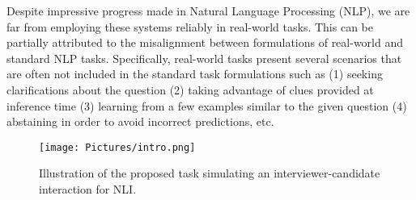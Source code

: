 \documentclass[11pt,a4paper]{article}
\providecommand{\Swaroop}[1]{
    {\protect\color{red}{[Swaroop: #1]}}
}
\newcommand{\Neeraj}[1]{{\small \color{red} [Neeraj: #1]}}
\begin{document}
Despite impressive progress made in Natural Language Processing (NLP), we are far from employing these systems reliably in real-world tasks. 
This can be partially attributed to the misalignment between formulations of real-world and standard NLP tasks.
Specifically, real-world tasks present several scenarios that are often not included in the standard task formulations such as 
(1) seeking clarifications about the question
(2) taking advantage of clues provided at inference time
(3) learning from a few examples similar to the given question
(4) abstaining in order to avoid incorrect predictions, etc.

\begin{figure}[t]
    \centering
    \texttt{[image: Pictures/intro.png]}
    \caption{Illustration of the proposed task simulating an interviewer-candidate interaction for NLI.
    }
    \label{fig:intro_figure}
\end{figure}
\end{document}
